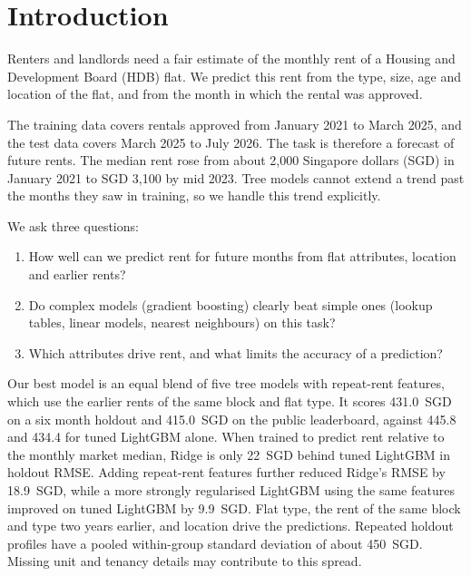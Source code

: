 \section{Introduction}\label{sec:intro}

Renters and landlords need a fair estimate of the monthly rent of a Housing and Development Board (HDB) flat. We predict this rent from the type, size, age and location of the flat, and from the month in which the rental was approved.

The training data covers rentals approved from January 2021 to March 2025, and the test data covers March 2025 to July 2026. The task is therefore a forecast of future rents. The median rent rose from about 2{,}000 Singapore dollars (SGD) in January 2021 to SGD 3{,}100 by mid 2023. Tree models cannot extend a trend past the months they saw in training, so we handle this trend explicitly.

We ask three questions:
\begin{enumerate}
\item How well can we predict rent for future months from flat attributes, location and earlier rents?
\item Do complex models (gradient boosting) clearly beat simple ones (lookup tables, linear models, nearest neighbours) on this task?
\item Which attributes drive rent, and what limits the accuracy of a prediction?
\end{enumerate}

Our best model is an equal blend of five tree models with repeat-rent features, which use the earlier rents of the same block and flat type. It scores 431.0~SGD on a six month holdout and 415.0~SGD on the public leaderboard, against 445.8 and 434.4 for tuned LightGBM alone. When trained to predict rent relative to the monthly market median, Ridge is only 22~SGD behind tuned LightGBM in holdout RMSE. Adding repeat-rent features further reduced Ridge's RMSE by 18.9~SGD, while a more strongly regularised LightGBM using the same features improved on tuned LightGBM by 9.9~SGD. Flat type, the rent of the same block and type two years earlier, and location drive the predictions. Repeated holdout profiles have a pooled within-group standard deviation of about 450~SGD. Missing unit and tenancy details may contribute to this spread.
